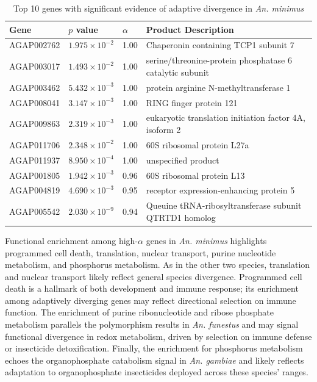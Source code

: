 \begin{table}[htp]
\centering
\begin{tabular}{@{}llll@{}}
\toprule
\textbf{Gene} & \textbf{$p$ value}     & \textbf{$\alpha$} & \textbf{Product Description}                                       \\ \midrule
AGAP002762    & $1.975\times10^{-2}$   & 1.00                 & Chaperonin containing TCP1 subunit 7                               \\
AGAP003017    & $1.493\times10^{-2}$   & 1.00                 & serine/threonine-protein phosphatase 6 catalytic subunit           \\
AGAP003462    & $5.432\times10^{-3}$   & 1.00                 & protein arginine N-methyltransferase 1                             \\
AGAP008041    & $3.147\times10^{-3}$   & 1.00                 & RING finger protein 121                                            \\
AGAP009863    & $2.319\times10^{-3}$   & 1.00                 & eukaryotic translation initiation factor 4A, isoform 2             \\
AGAP011706    & $2.348\times10^{-2}$   & 1.00                 & 60S ribosomal protein L27a                                         \\
AGAP011937    & $8.950\times10^{-4}$   & 1.00                 & unspecified product                                                \\
AGAP001805    & $1.942\times10^{-3}$   & 0.96                 & 60S ribosomal protein L13  \\
AGAP004819    & $4.690\times10^{-3}$   & 0.95                 & receptor expression-enhancing protein 5                            \\
AGAP005542    & $2.030\times10^{-9}$   & 0.94                 & Queuine tRNA-ribosyltransferase subunit QTRTD1 homolog             \\ \bottomrule
\end{tabular}
\caption{Top 10 genes with significant evidence of adaptive divergence in \textit{An. minimus}}
\label{table:aminMK}
\end{table}

Functional enrichment among high-$\alpha$ genes in \textit{An. minimus}
highlights programmed cell death, translation, nuclear transport,
purine nucleotide metabolism, and phosphorus metabolism.
As in the other two species, translation and nuclear transport
likely reflect general species divergence.
Programmed cell death is a hallmark of both development and immune response;
its enrichment among adaptively diverging genes
may reflect directional selection on immune function.
The enrichment of purine ribonucleotide and ribose phosphate metabolism
parallels the polymorphism results in \textit{An. funestus}
and may signal functional divergence in redox metabolism,
driven by selection on immune defense or insecticide detoxification.
Finally, the enrichment for phosphorus metabolism
echoes the organophosphate catabolism signal in \textit{An. gambiae}
and likely reflects adaptation to organophosphate insecticides
deployed across these species' ranges.

